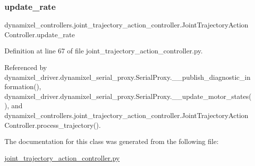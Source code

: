 \subsubsection{\texorpdfstring{update\+\_\+rate}{update\_rate}}
{\footnotesize\ttfamily dynamixel\+\_\+controllers.\+joint\+\_\+trajectory\+\_\+action\+\_\+controller.\+Joint\+Trajectory\+Action\+Controller.\+update\+\_\+rate}



Definition at line 67 of file joint\+\_\+trajectory\+\_\+action\+\_\+controller.\+py.



Referenced by dynamixel\+\_\+driver.\+dynamixel\+\_\+serial\+\_\+proxy.\+Serial\+Proxy.\+\_\+\+\_\+publish\+\_\+diagnostic\+\_\+information(), dynamixel\+\_\+driver.\+dynamixel\+\_\+serial\+\_\+proxy.\+Serial\+Proxy.\+\_\+\+\_\+update\+\_\+motor\+\_\+states(), and dynamixel\+\_\+controllers.\+joint\+\_\+trajectory\+\_\+action\+\_\+controller.\+Joint\+Trajectory\+Action\+Controller.\+process\+\_\+trajectory().



The documentation for this class was generated from the following file\+:\begin{DoxyCompactItemize}
\item 
\hyperlink{joint__trajectory__action__controller_8py}{joint\+\_\+trajectory\+\_\+action\+\_\+controller.\+py}\end{DoxyCompactItemize}
